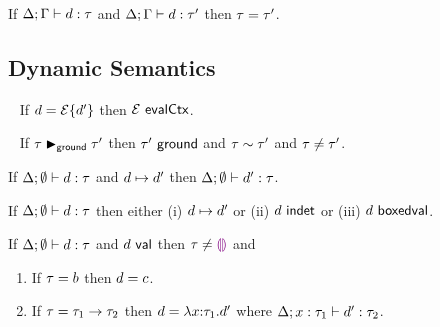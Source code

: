 \begin{theorem}
  If $\Delta; \Gamma \vdash d : \tau$
  and $\Delta; \Gamma \vdash d : \tau'$
  then $\tau=\tau'$.
\end{theorem}



\subsection{Dynamic Semantics}
\label{sec:evaluation}




{\color{gray}\blindtext}
{\color{gray}\blindtext}
{\color{gray}\blindtext}
{\color{gray}\blindtext}
{\color{gray}\blindtext}

\begin{lemma} ~
  If $d=\mathcal{E}\{d'\}$
  then $\mathcal{E}~\mathsf{evalCtx}$.
\end{lemma}

\begin{lemma} ~
  If $\tau \blacktriangleright_{\mathsf{ground}} \tau'$
  then $\tau'~\mathsf{ground}$
  and $\tau \sim \tau'$
  and $\tau\neq\tau'$.
\end{lemma}

\begin{theorem}[Preservation]
  If $\Delta; \emptyset \vdash d : \tau$ and
  $d \mapsto d'$ then
  $\Delta; \emptyset \vdash d' : \tau$.
\end{theorem}

\begin{theorem}[Progress]
  If $\Delta; \emptyset \vdash d : \tau$ then either
  (i) $d \mapsto d'$ or
  (ii) $d~\mathsf{indet}$ or
  (iii) $d~\mathsf{boxedval}$.
\end{theorem}

\begin{theorem}
  If $\Delta; \emptyset \vdash d : \tau$ and $d~\mathsf{val}$
  then $\tau\neq\textcolor{violet}{\llparenthesis}\textcolor{violet}{\rrparenthesis}$ and
  \begin{enumerate}[label=(\alph*)]
    \item If $\tau=b$ then $d=c$.
    \item If $\tau=\tau_1 \rightarrow \tau_2$
          then $d=\lambda x{:}\tau_1.d'$
          where $\Delta; x : \tau_1 \vdash d' : \tau_2$.
  \end{enumerate}
\end{theorem}

